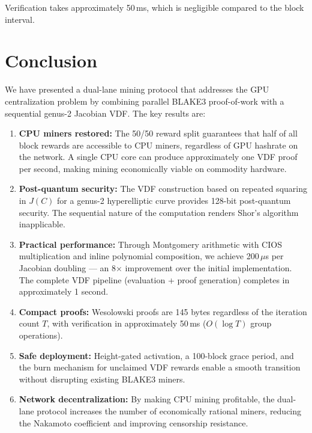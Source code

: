 \documentclass[11pt,a4paper]{article}
\begin{document}
Verification takes approximately 50\,ms, which is negligible compared to the block interval.

\section{Conclusion}
\label{sec:conclusion}

We have presented a dual-lane mining protocol that addresses the GPU centralization problem by combining parallel BLAKE3 proof-of-work with a sequential genus-2 Jacobian VDF. The key results are:

\begin{enumerate}
    \item \textbf{CPU miners restored:} The 50/50 reward split guarantees that half of all block rewards are accessible to CPU miners, regardless of GPU hashrate on the network. A single CPU core can produce approximately one VDF proof per second, making mining economically viable on commodity hardware.

    \item \textbf{Post-quantum security:} The VDF construction based on repeated squaring in $J(C)$ for a genus-2 hyperelliptic curve provides 128-bit post-quantum security. The sequential nature of the computation renders Shor's algorithm inapplicable.

    \item \textbf{Practical performance:} Through Montgomery arithmetic with CIOS multiplication and inline polynomial composition, we achieve 200\,$\mu$s per Jacobian doubling --- an 8$\times$ improvement over the initial implementation. The complete VDF pipeline (evaluation + proof generation) completes in approximately 1 second.

    \item \textbf{Compact proofs:} Wesolowski proofs are 145 bytes regardless of the iteration count $T$, with verification in approximately 50\,ms ($O(\log T)$ group operations).

    \item \textbf{Safe deployment:} Height-gated activation, a 100-block grace period, and the burn mechanism for unclaimed VDF rewards enable a smooth transition without disrupting existing BLAKE3 miners.

    \item \textbf{Network decentralization:} By making CPU mining profitable, the dual-lane protocol increases the number of economically rational miners, reducing the Nakamoto coefficient and improving censorship resistance.
\end{enumerate}
\end{document}
